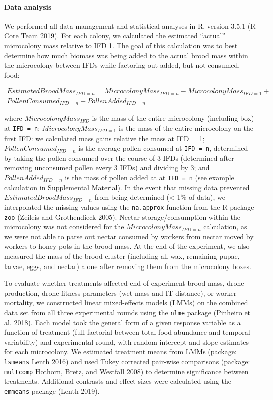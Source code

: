 \documentclass[11pt,]{article}
\let\oldparagraph\paragraph
\renewcommand{\paragraph}[1]{\oldparagraph{#1}\mbox{}}
\begin{document}
\hypertarget{data-analysis}{%
\paragraph{Data analysis}\label{data-analysis}}

We performed all data management and statistical analyses in R, version
3.5.1 (R Core Team 2019). For each colony, we calculated the estimated
``actual'' microcolony mass relative to IFD 1. The goal of this
calculation was to best determine how much biomass was being added to
the actual brood mass within the microcolony between IFDs while
factoring out added, but not consumed, food:

\[
\begin{aligned}
Estimated Brood Mass_{IFD = n} = Microcolony Mass_{IFD = n} - Microcolony Mass_{IFD = 1} + \\
Pollen Consumed_{IFD = n} - Pollen Added_{IFD = n}
\end{aligned}
\]

where \(Microcolony Mass_{IFD}\) is the mass of the entire microcolony
(including box) at \texttt{IFD\ =\ n}; \(Microcolony Mass_{IFD = 1}\) is
the mass of the entire microcolony on the first IFD: we calculated mass
gains relative the mass at IFD = 1; \(Pollen Consumed_{IFD = n}\) is the
average pollen consumed at \texttt{IFD\ =\ n}, determined by taking the
pollen consumed over the course of 3 IFDs (determined after removing
unconsumed pollen every 3 IFDs) and dividing by 3; and
\(Pollen Added_{IFD = n}\) is the mass of pollen added at at
\texttt{IFD\ =\ n} (see example calculation in Supplemental Material).
In the event that missing data prevented
\(Estimated Brood Mass_{IFD = n}\) from being determined (\textless{}
1\% of data), we interpolated the missing values using the
\texttt{na.approx} function from the R package \texttt{zoo} (Zeileis and
Grothendieck 2005). Nectar storage/consumption within the microcolony
was not considered for the \(Microcolony Mass_{IFD = n}\) calculation,
as we were not able to parse out nectar consumed by workers from nectar
moved by workers to honey pots in the brood mass. At the end of the
experiment, we also measured the mass of the brood cluster (including
all wax, remaining pupae, larvae, eggs, and nectar) alone after removing
them from the microcolony boxes.

To evaluate whether treatments affected end of experiment brood mass,
drone production, drone fitness parameters (wet mass and IT distance),
or worker mortality, we constructed linear mixed-effects models (LMMs)
on the combined data set from all three experimental rounds using the
\texttt{nlme} package (Pinheiro et al. 2018). Each model took the
general form of a given response variable as a function of treatment
(full-factorial between total food abundance and temporal variability)
and experimental round, with random intercept and slope estimates for
each microcolony. We estimated treatment means from LMMs (package:
\texttt{lsmeans} Lenth 2016) and used Tukey corrected pair-wise
comparisons (package: \texttt{multcomp} Hothorn, Bretz, and Westfall
2008) to determine significance between treatments. Additional contrasts
and effect sizes were calculated using the \texttt{emmeans} package
(Lenth 2019).
\end{document}
